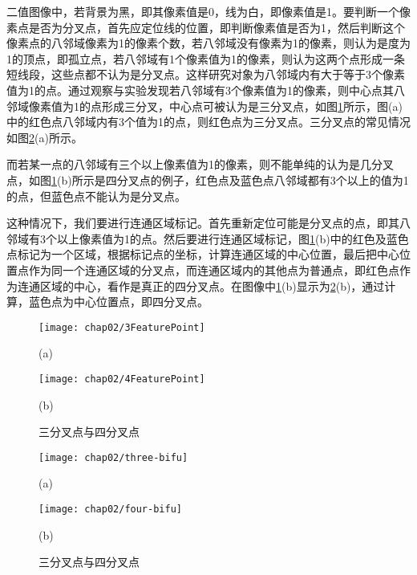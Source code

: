 二值图像中，若背景为黑，即其像素值是0，线为白，即像素值是1。要判断一个像素点是否为分叉点，首先应定位线的位置，即判断像素值是否为1，然后判断这个像素点的八邻域像素为1的像素个数，若八邻域没有像素为1的像素，则认为是度为1的顶点，即孤立点，若八邻域有1个像素值为1的像素，则认为这两个点形成一条短线段，这些点都不认为是分叉点。这样研究对象为八邻域内有大于等于3个像素值为1的点。通过观察与实验发现若八邻域有3个像素值为1的像素，则中心点其八邻域像素值为1的点形成三分叉，中心点可被认为是三分叉点，如图\ref{fig:FeaturePoints}所示，图(a)中的红色点八邻域内有3个值为1的点，则红色点为三分叉点。三分叉点的常见情况如图\ref{fig:FeaturePoints-image}(a)所示。

而若某一点的八邻域有三个以上像素值为1的像素，则不能单纯的认为是几分叉点，如图\ref{fig:FeaturePoints}(b)所示是四分叉点的例子，红色点及蓝色点八邻域都有3个以上的值为1的点，但蓝色点不能认为是分叉点。

这种情况下，我们要进行连通区域标记。首先重新定位可能是分叉点的点，即其八邻域有3个以上像素值为1的点。然后要进行连通区域标记，图\ref{fig:FeaturePoints}(b)中的红色及蓝色点标记为一个区域，根据标记点的坐标，计算连通区域的中心位置，最后把中心位置点作为同一个连通区域的分叉点，而连通区域内的其他点为普通点，即红色点作为连通区域的中心，看作是真正的四分叉点。在图像中\ref{fig:FeaturePoints}(b)显示为\ref{fig:FeaturePoints-image}(b)，通过计算，蓝色点为中心位置点，即四分叉点。

\begin{figure}[H]
\centering
  \begin{minipage}[b]{0.48\textwidth} 
      \centering 
      \texttt{[image: chap02/3FeaturePoint]}
        \centerline{(a)}\medskip
	 \label{fig:3FeaturePoint}
    \end{minipage}
  \begin{minipage}[b]{0.48\textwidth}
    \centering
    \texttt{[image: chap02/4FeaturePoint]}
      \centerline{(b)}\medskip
	\label{fig:4FeaturePoint}
  \end{minipage}
\caption{三分叉点与四分叉点}
\label{fig:FeaturePoints}
\end{figure}

\begin{figure}[H]
\centering
  \begin{minipage}[b]{1\textwidth} 
      \centering 
      \texttt{[image: chap02/three-bifu]}
        \centerline{(a)}\medskip
    \end{minipage}
  \begin{minipage}[b]{1\textwidth}
    \centering
    \texttt{[image: chap02/four-bifu]}
      \centerline{(b)}\medskip
  \end{minipage}
\caption{三分叉点与四分叉点}
\label{fig:FeaturePoints-image}
\end{figure}

